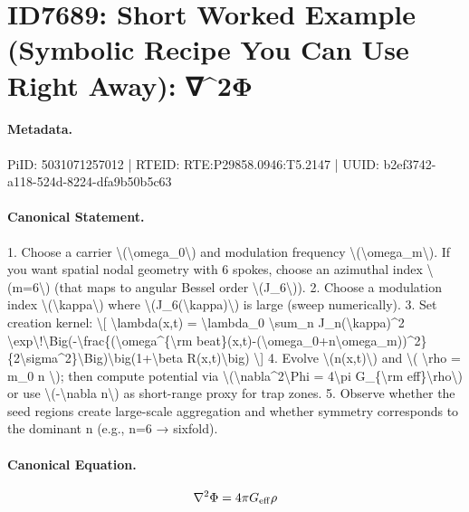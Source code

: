 \section*{ID7689: Short Worked Example (Symbolic Recipe You Can Use Right Away): ∇\textasciicircum{}2Φ}
\paragraph{Metadata.}
PiID: 5031071257012 | RTEID: RTE:P29858.0946:T5.2147 | UUID: b2ef3742-a118-524d-8224-dfa9b50b5c63

\paragraph{Canonical Statement.}
1. Choose a carrier \textbackslash{}(\textbackslash{}omega\_0\textbackslash{}) and modulation frequency \textbackslash{}(\textbackslash{}omega\_m\textbackslash{}). If you want spatial nodal geometry with 6 spokes, choose an azimuthal index \textbackslash{}(m=6\textbackslash{}) (that maps to angular Bessel order \textbackslash{}(J\_6\textbackslash{})). 2. Choose a modulation index \textbackslash{}(\textbackslash{}kappa\textbackslash{}) where \textbackslash{}(J\_6(\textbackslash{}kappa)\textbackslash{}) is large (sweep numerically). 3. Set creation kernel: \textbackslash{}[ \textbackslash{}lambda(x,t) = \textbackslash{}lambda\_0 \textbackslash{}sum\_n J\_n(\textbackslash{}kappa)\textasciicircum{}2 \textbackslash{}exp\textbackslash{}!\textbackslash{}Big(-\textbackslash{}frac\{(\textbackslash{}omega\textasciicircum{}\{\textbackslash{}rm beat\}(x,t)-(\textbackslash{}omega\_0+n\textbackslash{}omega\_m))\textasciicircum{}2\}\{2\textbackslash{}sigma\textasciicircum{}2\}\textbackslash{}Big)\textbackslash{}big(1+\textbackslash{}beta R(x,t)\textbackslash{}big) \textbackslash{}] 4. Evolve \textbackslash{}(n(x,t)\textbackslash{}) and \textbackslash{}( \textbackslash{}rho = m\_0 n \textbackslash{}); then compute potential via \textbackslash{}(\textbackslash{}nabla\textasciicircum{}2\textbackslash{}Phi = 4\textbackslash{}pi G\_\{\textbackslash{}rm eff\}\textbackslash{}rho\textbackslash{}) or use \textbackslash{}(-\textbackslash{}nabla n\textbackslash{}) as short-range proxy for trap zones. 5. Observe whether the seed regions create large-scale aggregation and whether symmetry corresponds to the dominant n (e.g., n=6 → sixfold).

\paragraph{Canonical Equation.}
\[
\nabla^2\Phi = 4\pi G_{\rm eff}\rho
\]

